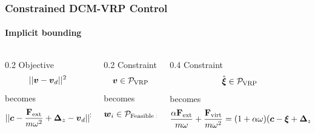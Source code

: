 \documentclass[10pt]{beamer}
\begin{document}
\begin{frame}
  \frametitle{Constrained DCM-VRP Control}
  \framesubtitle{Implicit bounding}
  \centering
  \begin{columns}
    \begin{column}{0.2\textwidth}
      Objective
      \begin{equation*}
        ||\boldsymbol{v} - \boldsymbol{v}_{d}||^2
      \end{equation*}
      becomes
      \begin{equation*}
        ||\boldsymbol{c} - \frac{\mathbf{F}_\text{ext}}{m\omega^2} + \boldsymbol{\Delta}_z - \boldsymbol{v}_d||^2
      \end{equation*}
    \end{column}
    \begin{column}{0.2\textwidth}
      Constraint
      \begin{equation*}
        \boldsymbol{v} \in \cal{P}_\text{VRP}
      \end{equation*}
      becomes
      \begin{equation*}
        \boldsymbol{w}_i \in \cal{P}_\text{Feasible i}
      \end{equation*}
    \end{column}
    \begin{column}{0.4\textwidth}
      Constraint
      \begin{equation*}
        \hat{\boldsymbol{\xi}} \in \cal{P}_\text{VRP}
      \end{equation*}
      becomes
      \begin{equation*}
        \frac{\alpha\mathbf{F}_\text{ext}}{m\omega} + \frac{\mathbf{F}_\text{virt}}{m\omega^2} = (1 +
        \alpha\omega)(\boldsymbol{c} - \boldsymbol{\xi} + \boldsymbol{\Delta}_z)
      \end{equation*}
    \end{column}
  \end{columns}
\end{frame}
\end{document}
